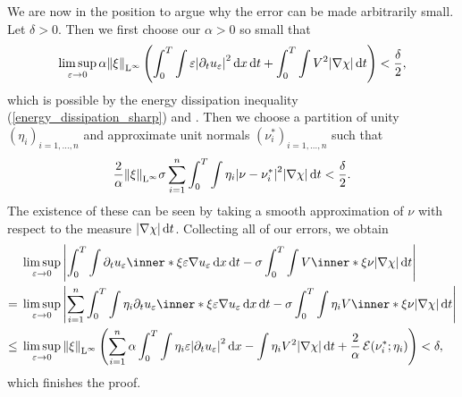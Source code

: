 We are now in the position to argue why the error can be made arbitrarily small. 
Let $ \delta > 0 $. Then we first choose our $ \alpha > 0 $ so small that 
\begin{equation*}
	\limsup_{ \varepsilon \to 0 }
	\alpha \norm{ \xi }_{ \operatorname{L}^{ \infty } }
	\left(
		\int_{ 0 }^{ T }
			\int
				\varepsilon 
				\abs{ \partial_{  t } u_{ \varepsilon } }^{ 2 }
			\dd{ x }
		\dd{ t }
		+
		\int_{ 0 }^{ T }
			\int
				V^{ 2 }
			\abs{ \nabla \chi }
		\dd{ t }
	\right)
	<
	\frac{ \delta }{ 2 },
\end{equation*}
which is possible by the energy dissipation inequality (\ref{energy_dissipation_sharp}) and .
Then we choose a partition of unity $ \left( \eta_{ i } \right)_{ i = 1 , \dotsc , n } $ and approximate unit normals $ \left( \nu^{ \ast }_{ i }\right)_{i = 1 , \dotsc, n } $ such that
\begin{equation*}
	\frac{ 2 }{ \alpha }
	\norm{ \xi }_{ \operatorname{L}^{ \infty } }
	\sigma
	\sum_{ i = 1 }^{ n }
		\int_{ 0 }^{ T }
			\int
			 	\eta_{ i }
			 	\abs{ \nu - \nu_{ i }^{ \ast } }^{ 2 }
			 \abs{ \nabla \chi }
		\dd{ t }
	<
	\frac{ \delta }{2 }.
\end{equation*}
The existence of these can be seen by taking a smooth approximation of $ \nu $ with respect to the measure $ \abs{ \nabla \chi } \dd{ t } $.
Collecting all of our errors, we obtain
\begin{align*}
	& \limsup_{ \varepsilon \to 0 }
		\abs{
		\int_{ 0 }^{ T }
			\int
				\partial_{  t } u_{ \varepsilon }
				\inner*{ \xi }{ \varepsilon \nabla u_{ \varepsilon } }
			\dd{ x }
		\dd{ t }
		-
		\sigma
		\int_{ 0 }^{ T }
			\int
				V \inner*{ \xi }{ \nu }
			\abs{ \nabla \chi }
		\dd{ t }
		}
	\\
	= {} &
	\limsup_{ \varepsilon \to 0 }
	\abs{
		\sum_{ i = 1 }^{ n }
		\int_{ 0 }^{ T }
			\int
			\eta_{ i }
			\partial_{  t } u_{ \varepsilon }
			\inner*{ \xi }{ \varepsilon \nabla u_{ \varepsilon } }
			\dd{ x }
		\dd{ t }
		-
		\sigma
		\int_{ 0 }^{ T }
			\int
			\eta_{ i }
			V \inner*{ \xi }{ \nu }
			\abs{ \nabla \chi }
		\dd{ t }
	}
	\\
	\leq {} & 
	\limsup_{ \varepsilon \to 0 }
	\norm{ \xi }_{ \lp^{ \infty } }
	\left(
	\sum_{ i = 1 }^{ n } 
		\alpha \int_{ 0 }^{ T }
			\int
				\eta_{ i }
				\varepsilon
				\abs{ \partial_{  t } u_{ \varepsilon } }^{ 2 }
			\dd{ x }
			-
			\int
			 	\eta_{ i }
			 	V^{ 2 }
			 \abs{ \nabla \chi }
		\dd{ t }
		+
		\frac{ 2 }{ \alpha }
		\tilt_excess ( \nu_{ i }^{ \ast } ; \eta_{ i } )
	\right)
	< \delta,
\end{align*}
which finishes the proof.

